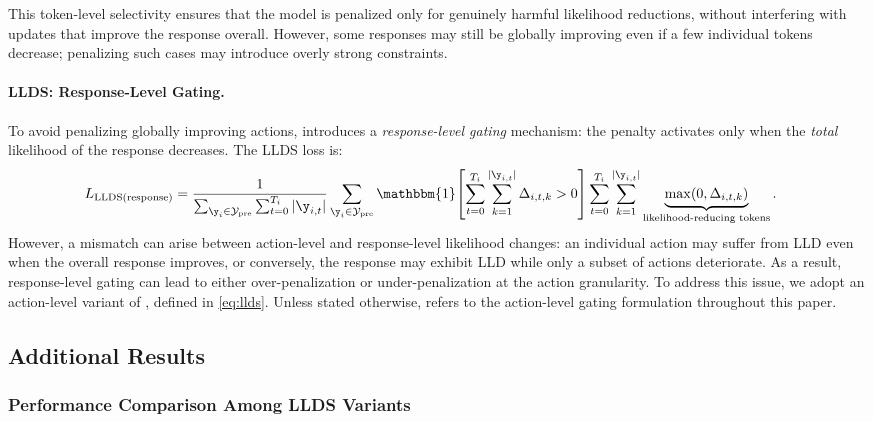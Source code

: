 This token-level selectivity ensures that the model is penalized only for genuinely harmful likelihood reductions, without interfering with updates that improve the response overall. However, some responses may still be globally improving even if a few individual tokens decrease; penalizing such cases may introduce overly strong constraints.

\paragraph{LLDS: Response-Level Gating.}
To avoid penalizing globally improving actions, \ours{} introduces a \emph{response-level gating} mechanism: the penalty activates only when the \emph{total} likelihood of the response decreases. The LLDS loss is:
\begin{align}
L_{\rm LLDS (response)}
&=
\frac{1}{\sum_{\y_i\in \mathcal{Y}_{\rm pre}} \sum_{t=0}^{T_i} |\y_{i,t}|}
\sum_{\y_i\in \mathcal{Y}_{\rm pre}}
\mathbbm{1}\!\left[\sum_{t=0}^{T_i} \sum_{k=1}^{|\y_{i,t}|}\Delta_{i,t,k} > 0\right]
\sum_{t=0}^{T_i} \sum_{k=1}^{|\y_{i,t}|}
\underbrace{\max(0,\Delta_{i,t,k})}_{\text{likelihood-reducing tokens}} .
\end{align}
However, a mismatch can arise between action-level and response-level likelihood changes: an individual action may suffer from LLD even when the overall response improves, or conversely, the response may exhibit LLD while only a subset of actions deteriorate. As a result, response-level gating can lead to either over-penalization or under-penalization at the action granularity. 
To address this issue, we adopt an action-level variant of \ours{}, defined in \cref{eq:llds}. Unless stated otherwise, \ours{} refers to the action-level gating formulation throughout this paper. 

\subsection{Additional Results}\label{sec:add_result}

\subsubsection{Performance Comparison Among LLDS Variants}

